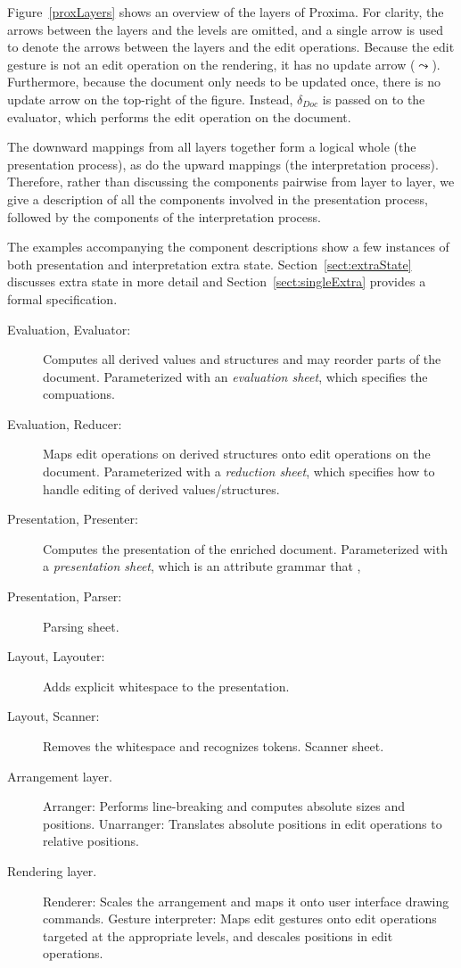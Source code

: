 Figure~\ref{proxLayers} shows an overview of the layers of Proxima. For clarity, the arrows between the layers and the levels are omitted, and a single arrow is used to denote the arrows between the layers and the edit operations. Because the edit gesture is not an edit operation on the rendering, it has no update arrow ($\leadsto$). Furthermore, because the document only needs to be updated once, there is no update arrow on the top-right of the figure. Instead, $\delta_{Doc}$ is passed on to the evaluator, which performs the edit operation on the document.

The downward mappings from all layers together form a logical whole (the presentation process), as do the upward mappings (the interpretation process). Therefore, rather than discussing the components pairwise from layer to layer, we give a description of all the components involved in the presentation process, followed by the components of the interpretation process. 

The examples accompanying the component descriptions show a few instances of both presentation and interpretation extra state. Section~\ref{sect:extraState} discusses extra state in more detail and Section~\ref{sect:singleExtra} provides a formal specification. 

\bc
\begin{description}
\item [Evaluation, Evaluator:] Computes all derived values and structures and may reorder parts of the document. Parameterized with an {\em evaluation sheet}, which specifies the compuations.
\item [Evaluation, Reducer:] Maps edit operations on derived structures onto edit operations on the document. Parameterized with a {\em reduction sheet}, which specifies how to handle editing of derived values/structures.
\item [Presentation, Presenter:] Computes the presentation of the enriched document. Parameterized with a {\em presentation sheet}, which is an attribute grammar that , 
\item [Presentation, Parser:] Parsing sheet.
\item [Layout, Layouter:] Adds explicit whitespace to the presentation.
\item [Layout, Scanner:] Removes the whitespace and recognizes tokens. Scanner sheet.
\item [Arrangement layer.]
Arranger: Performs line-breaking and computes absolute sizes and positions.
Unarranger: Translates absolute positions in edit operations to relative positions.
\item [Rendering layer.]
Renderer: Scales the arrangement and maps it onto user interface drawing commands.
Gesture interpreter: Maps edit gestures onto edit operations targeted at the appropriate levels, and descales positions in edit operations.
\end{description}
\ec


